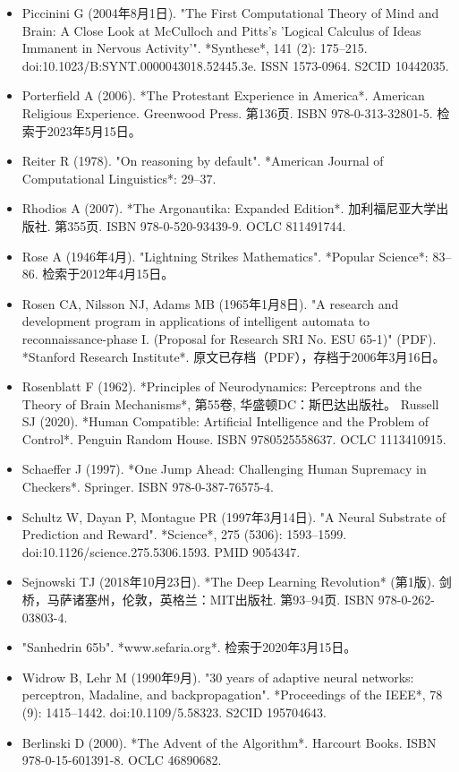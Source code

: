\begin{itemize}
\item Piccinini G (2004年8月1日). "The First Computational Theory of Mind and Brain: A Close Look at McCulloch and Pitts's 'Logical Calculus of Ideas Immanent in Nervous Activity'". *Synthese*, 141 (2): 175–215. doi:10.1023/B:SYNT.0000043018.52445.3e. ISSN 1573-0964. S2CID 10442035.  
\item Porterfield A (2006). *The Protestant Experience in America*. American Religious Experience. Greenwood Press. 第136页. ISBN 978-0-313-32801-5. 检索于2023年5月15日。  
\item Reiter R (1978). "On reasoning by default". *American Journal of Computational Linguistics*: 29–37.  
\item Rhodios A (2007). *The Argonautika: Expanded Edition*. 加利福尼亚大学出版社. 第355页. ISBN 978-0-520-93439-9. OCLC 811491744.  
\item Rose A (1946年4月). "Lightning Strikes Mathematics". *Popular Science*: 83–86. 检索于2012年4月15日。  
\item Rosen CA, Nilsson NJ, Adams MB (1965年1月8日). "A research and development program in applications of intelligent automata to reconnaissance-phase I. (Proposal for Research SRI No. ESU 65-1)" (PDF). *Stanford Research Institute*. 原文已存档（PDF），存档于2006年3月16日。  
\item Rosenblatt F (1962). *Principles of Neurodynamics: Perceptrons and the Theory of Brain Mechanisms*, 第55卷, 华盛顿DC：斯巴达出版社。  
Russell SJ (2020). *Human Compatible: Artificial Intelligence and the Problem of Control*. Penguin Random House. ISBN 9780525558637. OCLC 1113410915.  
\item Schaeffer J (1997). *One Jump Ahead: Challenging Human Supremacy in Checkers*. Springer. ISBN 978-0-387-76575-4.
\item Schultz W, Dayan P, Montague PR (1997年3月14日). "A Neural Substrate of Prediction and Reward". *Science*, 275 (5306): 1593–1599. doi:10.1126/science.275.5306.1593. PMID 9054347.  
\item Sejnowski TJ (2018年10月23日). *The Deep Learning Revolution* (第1版). 剑桥，马萨诸塞州，伦敦，英格兰：MIT出版社. 第93–94页. ISBN 978-0-262-03803-4.  
\item "Sanhedrin 65b". *www.sefaria.org*. 检索于2020年3月15日。  
\item Widrow B, Lehr M (1990年9月). "30 years of adaptive neural networks: perceptron, Madaline, and backpropagation". *Proceedings of the IEEE*, 78 (9): 1415–1442. doi:10.1109/5.58323. S2CID 195704643.
\item Berlinski D (2000). *The Advent of the Algorithm*. Harcourt Books. ISBN 978-0-15-601391-8. OCLC 46890682.  

\end{itemize}
